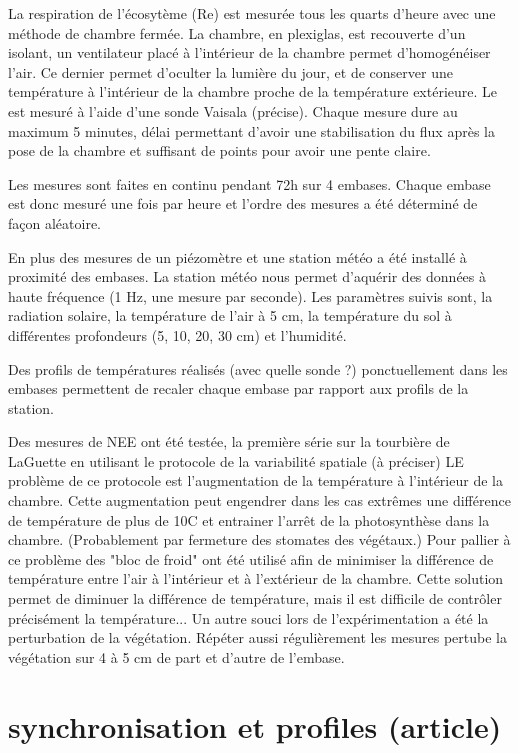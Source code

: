 La respiration de l'écosytème (Re) est mesurée tous les quarts d'heure avec une méthode de chambre fermée.
La chambre, en plexiglas, est recouverte d'un isolant, un ventilateur placé à l'intérieur de la chambre permet d'homogénéiser l'air.
Ce dernier permet d'oculter la lumière du jour, et de conserver une température à l'intérieur de la chambre proche de la température extérieure.
Le \COO est mesuré à l'aide d'une sonde Vaisala (\plop précise).
Chaque mesure dure au maximum 5 minutes, délai permettant d'avoir une stabilisation du flux après la pose de la chambre et suffisant de points pour avoir une pente claire.

Les mesures sont faites en continu pendant 72h sur 4 embases. 
Chaque embase est donc mesuré une fois par heure et l'ordre des mesures a été déterminé de façon aléatoire.

En plus des mesures de \COO un piézomètre et une station météo a été installé à proximité des embases.
La station météo nous permet d'aquérir des données à haute fréquence (1 Hz, une mesure par seconde).
Les paramètres suivis sont, la radiation solaire, la température de l'air à 5 cm, la température du sol à différentes profondeurs (5, 10, 20, 30 cm) et l'humidité.

Des profils de températures réalisés (avec quelle sonde ?) ponctuellement dans les embases permettent de recaler chaque embase par rapport aux profils de la station.

Des mesures de NEE ont été testée, la première série sur la tourbière de LaGuette en utilisant le protocole de la variabilité spatiale (à préciser)
LE problème de ce protocole est l'augmentation de la température à l'intérieur de la chambre.
Cette augmentation peut engendrer dans les cas extrêmes une différence de température de plus de 10\degres C et entrainer l'arrêt de la photosynthèse dans la chambre.
(Probablement par fermeture des stomates des végétaux.)
Pour pallier à ce problème des "bloc de froid" ont été utilisé afin de minimiser la différence de température entre l'air à l'intérieur et à l'extérieur de la chambre.
Cette solution permet de diminuer la différence de température, mais il est difficile de contrôler précisément la température...
Un autre souci lors de l'expérimentation a été la perturbation de la végétation.
Répéter aussi régulièrement les mesures pertube la végétation sur 4 à 5 cm de part et d'autre de l'embase.

\section{synchronisation et profiles (article)}
